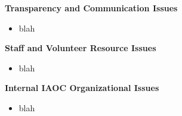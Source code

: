\documentclass[helvetica]{seminar}
\newcommand{\heading}[1]{%
  \begin{center} 
    \large\bf 
    #1 
  \end{center} 
  \vspace{.4 in}}
\begin{document}
\begin{slide}
\heading{Transparency and Communication Issues}

\begin{itemize}
\item blah
\end{itemize}

\end{slide}

\begin{slide}
\heading{Staff and Volunteer Resource Issues}

\begin{itemize}
\item blah
\end{itemize}

\end{slide}

\begin{slide}
\heading{Internal IAOC Organizational Issues}

\begin{itemize}
\item blah
\end{itemize}

\end{slide}
\end{document}
